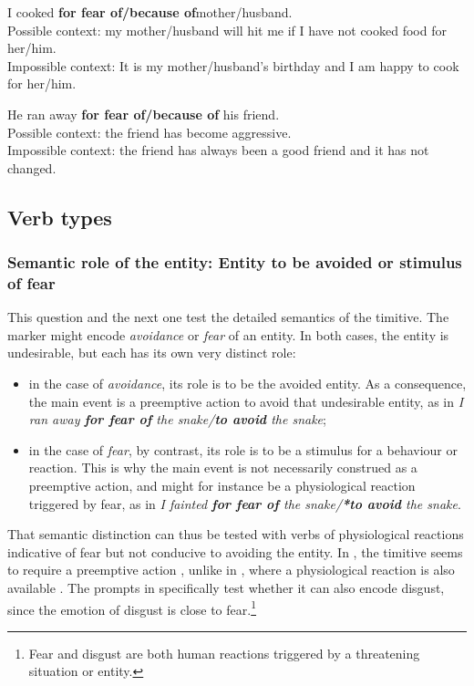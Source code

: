 \documentclass[output=paper,colorlinks,citecolor=brown]{langscibook}
\begin{document}
\ea \label{p62} I cooked \textbf{for fear of/because of}mother\textnormal{/}husband. \\
\textnormal{Possible context: my mother/husband will hit me if I have not cooked food for her/him.} \\
    \textnormal{Impossible context: It is my mother/husband's birthday and I am happy to cook for her/him.}
\z

\ea \label{p63} He ran away \textbf{for fear of/because of} his friend.\\
\textnormal{Possible context: the friend has become aggressive.}\\
\textnormal{Impossible context: the friend has always been a good friend and it has not changed.}
\z




\subsection{Verb types}
\label{subsec:timverbtypes}

\subsubsection{Semantic role of the entity: Entity to be avoided or stimulus of fear}
\label{3.2.1}

This question and the next one test the detailed semantics of the timitive. The marker might encode \textit{avoidance} or \textit{fear} of an entity. In both cases, the entity is undesirable, but each has its own very distinct role:

\begin{itemize}
    \item in the case of \textit{avoidance}, its role is to be the avoided entity. As a consequence, the main event is a preemptive action to avoid that undesirable entity, as in \textit{I ran away \textbf{for fear of} the snake/\textbf{to avoid} the snake};
    \item in the case of \textit{fear}, by contrast, its role is to be a stimulus for a behaviour or reaction. This is why the main event is not necessarily construed as a preemptive action, and might for instance be a physiological reaction triggered by fear, as in \textit{I fainted \textbf{for fear of} the snake/\textbf{*to avoid} the snake}.
\end{itemize}


That semantic distinction can thus be tested with verbs of physiological reactions indicative of fear but not conducive to avoiding the entity. In , the timitive seems to require a preemptive action \citep[58]{green1989}, unlike in , where a physiological reaction is also available \citep[284]{vuillermet2018a}. The prompts in  specifically test whether it can also encode disgust, since the emotion of disgust is close to fear.\footnote{Fear and disgust are both human reactions triggered by a threatening situation or entity.}
\end{document}
